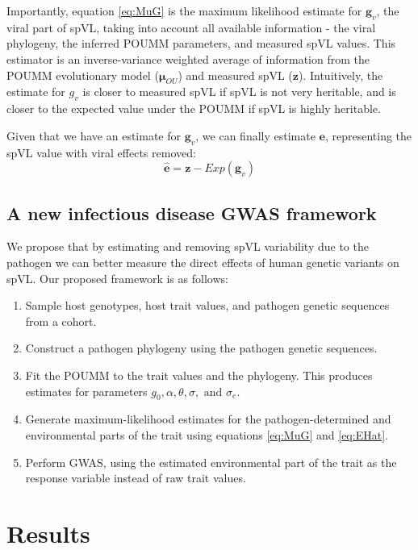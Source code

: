 \documentclass[]{article}
\begin{document}
\begin{doublespace}
Importantly, equation \ref{eq:MuG} is the maximum likelihood estimate for $\bm{g}_v$, the viral part of spVL, taking into account all available information - the viral phylogeny, the inferred POUMM parameters, and measured spVL values. This estimator is an inverse-variance weighted average of information from the POUMM evolutionary model ($\bm{\mu}_{OU}$) and measured spVL ($\bm{z}$). Intuitively, the estimate for $g_v$ is closer to measured spVL if spVL is not very heritable, and is closer to the expected value under the POUMM if spVL is highly heritable. 

Given that we have an estimate for $\bm{g}_v$, we can finally estimate $\bm{e}$, representing the spVL value with viral effects removed: 
\begin{equation}
	\hat{\bm{e}} = \bm{z} - Exp(\bm{g}_v)
	\label{eq:EHat}
\end{equation}

\subsection{A new infectious disease GWAS framework}

We propose that by estimating and removing spVL variability due to the pathogen we can better measure the direct effects of human genetic variants on spVL. Our proposed framework is as follows:

\begin{enumerate}
	\item Sample host genotypes, host trait values, and pathogen genetic sequences from a cohort.
	\item Construct a pathogen phylogeny using the pathogen genetic sequences.
	\item Fit the POUMM to the trait values and the phylogeny. This produces estimates for parameters $g_0, \alpha, \theta, \sigma,\text{ and }\sigma_e$.
	\item Generate maximum-likelihood estimates for the pathogen-determined and environmental parts of the trait using equations \ref{eq:MuG} and \ref{eq:EHat}.
	\item Perform GWAS, using the estimated environmental part of the trait as the response variable instead of raw trait values. 
\end{enumerate}

\section{Results}


\end{doublespace}
\end{document}
